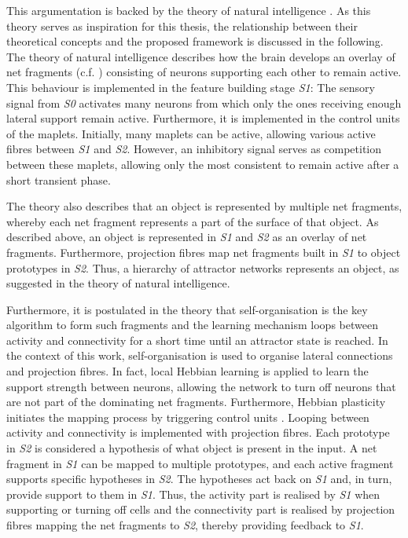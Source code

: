 This argumentation is backed by the theory of natural intelligence \cite{von_der_malsburg_theory_2022}.
As this theory serves as inspiration for this thesis, the relationship between their theoretical concepts and the proposed framework is discussed in the following.
The theory of natural intelligence describes how the brain develops an overlay of net fragments (c.f. ) consisting of neurons supporting each other to remain active.
This behaviour is implemented in the feature building stage \emph{S1}: The sensory signal from \emph{S0} activates many neurons from which only the ones receiving enough lateral support remain active. Furthermore, it is implemented in the control units of the maplets. Initially, many maplets can be active, allowing various active fibres between \emph{S1} and \emph{S2}. However, an inhibitory signal serves as competition between these maplets, allowing only the most consistent to remain active after a short transient phase.

The theory also describes that an object is represented by multiple net fragments, whereby each net fragment represents a part of the surface of that object.
As described above, an object is represented in \emph{S1} and \emph{S2} as an overlay of net fragments. Furthermore, projection fibres map net fragments built in \emph{S1} to object prototypes in \emph{S2}.
Thus, a hierarchy of attractor networks represents an object, as suggested in the theory of natural intelligence.

Furthermore, it is postulated in the theory that self-organisation is the key algorithm to form such fragments and the learning mechanism loops between activity and connectivity for a short time until an attractor state is reached.
In the context of this work, self-organisation is used to organise lateral connections and projection fibres. In fact, local Hebbian learning  is applied to learn the support strength between neurons, allowing the network to turn off neurons that are not part of the dominating net fragments.
Furthermore, Hebbian plasticity initiates the mapping process by triggering control units .
Looping between activity and connectivity is implemented with projection fibres. 
Each prototype in \emph{S2} is considered a hypothesis of what object is present in the input. A net fragment in \emph{S1} can be mapped to multiple prototypes, and each active fragment supports specific hypotheses in \emph{S2}. The hypotheses act back on \emph{S1} and, in turn, provide support to them in \emph{S1}. Thus, the activity part is realised by \emph{S1} when supporting or turning off cells and the connectivity part is realised by projection fibres mapping the net fragments to \emph{S2}, thereby providing feedback to \emph{S1}.

